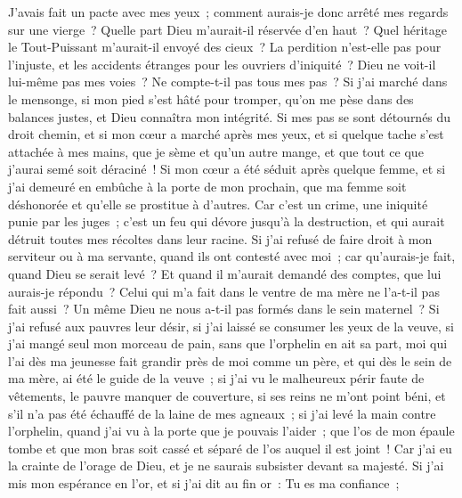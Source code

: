 \begin{multicols}{2}
\VerseOne{}J'avais fait un pacte avec mes yeux~; comment aurais-je donc arrêté mes regards sur une vierge~? 
Quelle part Dieu m'aurait-il réservée d'en haut~? Quel héritage le Tout-Puissant m'aurait-il envoyé des cieux~?
La perdition n'est-elle pas pour l'injuste, et les accidents étranges pour les ouvriers d'iniquité~?
Dieu ne voit-il lui-même pas mes voies~? Ne compte-t-il pas tous mes pas~?
Si j'ai marché dans le mensonge, si mon pied s'est hâté pour tromper,
qu'on me pèse dans des balances justes, et Dieu connaîtra mon intégrité.
Si mes pas se sont détournés du droit chemin, et si mon cœur a marché après mes yeux, et si quelque tache s'est attachée à mes mains,
que je sème et qu'un autre mange, et que tout ce que j'aurai semé soit déraciné~!
Si mon cœur a été séduit après quelque femme, et si j'ai demeuré en embûche à la porte de mon prochain,
que ma femme soit déshonorée et qu'elle se prostitue à d'autres.
Car c'est un crime, une iniquité punie par les juges~;
c'est un feu qui dévore jusqu'à la destruction, et qui aurait détruit toutes mes récoltes dans leur racine.
Si j'ai refusé de faire droit à mon serviteur ou à ma servante, quand ils ont contesté avec moi~;
car qu'aurais-je fait, quand Dieu se serait levé~? Et quand il m'aurait demandé des comptes, que lui aurais-je répondu~?
Celui qui m'a fait dans le ventre de ma mère ne l'a-t-il pas fait aussi~? Un même Dieu ne nous a-t-il pas formés dans le sein maternel~?
Si j'ai refusé aux pauvres leur désir, si j'ai laissé se consumer les yeux de la veuve,
si j'ai mangé seul mon morceau de pain, sans que l'orphelin en ait sa part,
moi qui l'ai dès ma jeunesse fait grandir près de moi comme un père, et qui dès le sein de ma mère, ai été le guide de la veuve~;
si j'ai vu le malheureux périr faute de vêtements, le pauvre manquer de couverture,
si ses reins ne m'ont point béni, et s'il n'a pas été échauffé de la laine de mes agneaux~;
si j'ai levé la main contre l'orphelin, quand j'ai vu à la porte que je pouvais l'aider~;
que l'os de mon épaule tombe et que mon bras soit cassé et séparé de l'os auquel il est joint~!
Car j'ai eu la crainte de l'orage de Dieu, et je ne saurais subsister devant sa majesté. 
Si j'ai mis mon espérance en l'or, et si j'ai dit au fin or~: Tu es ma confiance~;

\end{multicols}
